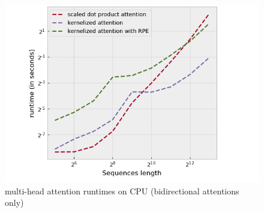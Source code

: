 \begin{figure}
	\center
	\includegraphics[width=0.7\linewidth]{images/runtimes_MHA.png}
	\caption{multi-head attention runtimes on CPU (bidirectional attentions only)}
	\label{fig:multihead_attention_timings}
\end{figure}

\endinput
